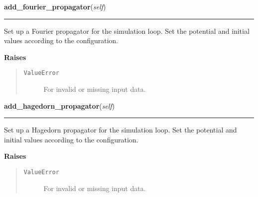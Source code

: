 \hspace{.8\funcindent}\begin{boxedminipage}{\funcwidth}

    \raggedright \textbf{add\_fourier\_propagator}(\textit{self})

    \vspace{-1.5ex}

    \rule{\textwidth}{0.5\fboxrule}
\setlength{\parskip}{2ex}
    Set up a Fourier propagator for the simulation loop. Set the potential
    and initial values according to the configuration.

\setlength{\parskip}{1ex}
      \textbf{Raises}
    \vspace{-1ex}

      \begin{quote}
        \begin{description}

          \item[\texttt{ValueError}]

          For invalid or missing input data.

        \end{description}

      \end{quote}

    \end{boxedminipage}

    \label{SimulationLoop:SimulationLoop:add_hagedorn_propagator}

    \vspace{0.5ex}

\hspace{.8\funcindent}\begin{boxedminipage}{\funcwidth}

    \raggedright \textbf{add\_hagedorn\_propagator}(\textit{self})

    \vspace{-1.5ex}

    \rule{\textwidth}{0.5\fboxrule}
\setlength{\parskip}{2ex}
    Set up a Hagedorn propagator for the simulation loop. Set the potential
    and initial values according to the configuration.

\setlength{\parskip}{1ex}
      \textbf{Raises}
    \vspace{-1ex}

      \begin{quote}
        \begin{description}

          \item[\texttt{ValueError}]

          For invalid or missing input data.

        \end{description}

      \end{quote}

    \end{boxedminipage}

